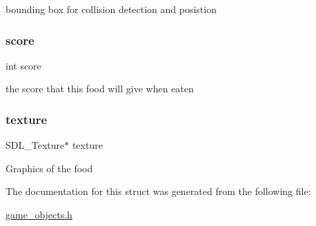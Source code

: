 bounding box for collision detection and posistion \mbox{\label{structfood__object_aef160b7437d94056f1dc59646cd5b87d}} 
\subsubsection{\texorpdfstring{score}{score}}
{\footnotesize\ttfamily int score}

the score that this food will give when eaten \mbox{\label{structfood__object_a859b8efbf9abe8e82757ee5c75a0c97c}} 
\subsubsection{\texorpdfstring{texture}{texture}}
{\footnotesize\ttfamily S\+D\+L\+\_\+\+Texture$\ast$ texture}

Graphics of the food 

The documentation for this struct was generated from the following file\+:\begin{DoxyCompactItemize}
\item 
\mbox{\hyperlink{game__objects_8h}{game\+\_\+objects.\+h}}\end{DoxyCompactItemize}
